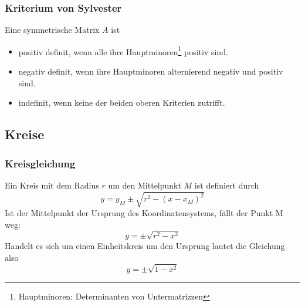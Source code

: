 \subsubsection{Kriterium von Sylvester}
\label{ssub:kriterium_von_sylvester}

Eine symmetrische Matrix $A$ ist 
\begin{itemize}
	\item positiv definit, wenn alle ihre Hauptminoren\footnote{Hauptminoren: Determinanten von Untermatrizzen} positiv sind.
	\item negativ definit, wenn ihre Hauptminoren alternierend negativ und positiv sind.
	\item indefinit, wenn keine der beiden oberen Kriterien zutrifft.
\end{itemize}

\subsection{Kreise} 
\label{sub:kreise}

\subsubsection{Kreisgleichung} 
\label{ssub:kreisgleichung}

Ein Kreis mit dem Radius $r$ um den Mittelpunkt $M$ ist definiert durch
\begin{equation}
	y = y_M \pm \sqrt{r^2 - (x-x_M)^2}
\end{equation}
Ist der Mittelpunkt der Ursprung des Koordinatensystems, fällt der Punkt M weg:
\begin{equation}
	y = \pm \sqrt{r^2-x^2}
\end{equation}
Handelt es sich um einen Einheitskreis um den Ursprung lautet die Gleichung also
\begin{equation}
	y = \pm \sqrt{1-x^2}
\end{equation}
